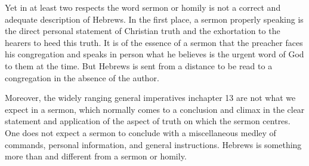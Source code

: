 Yet in at least two respects the word sermon or homily is not a correct and
adequate description of Hebrews.
In the first place, a sermon properly speaking is the direct personal statement
of Christian truth and the exhortation to the hearers to heed this truth.
It is of the essence of a sermon that the preacher faces his congregation and
speaks in person what he believes is the urgent word of God to them at the time.
But Hebrews is sent from a distance to be read to a congregation in the absence
of the author.

Moreover, the widely ranging general imperatives inchapter 13 are not what we
expect in a sermon, which normally comes to a conclusion and climax in the clear
statement and application of the aspect of truth on which the sermon centres.
One does not expect a sermon to conclude with a miscellaneous medley of
commands, personal information, and general instructions.
Hebrews is something more than and different from a sermon or homily.
